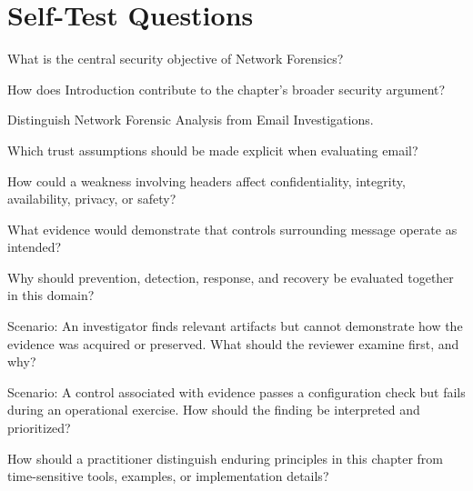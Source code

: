 \documentclass[11pt,letterpaper]{article}
\begin{document}
\section*{Self-Test Questions}
\begin{CornellRecallList}
\item What is the central security objective of Network Forensics?
\item How does Introduction contribute to the chapter's broader security argument?
\item Distinguish Network Forensic Analysis from Email Investigations.
\item Which trust assumptions should be made explicit when evaluating email?
\item How could a weakness involving headers affect confidentiality, integrity, availability, privacy, or safety?
\item What evidence would demonstrate that controls surrounding message operate as intended?
\item Why should prevention, detection, response, and recovery be evaluated together in this domain?
\item Scenario: An investigator finds relevant artifacts but cannot demonstrate how the evidence was acquired or preserved. What should the reviewer examine first, and why?
\item Scenario: A control associated with evidence passes a configuration check but fails during an operational exercise. How should the finding be interpreted and prioritized?
\item How should a practitioner distinguish enduring principles in this chapter from time-sensitive tools, examples, or implementation details?
\end{CornellRecallList}
\end{document}
